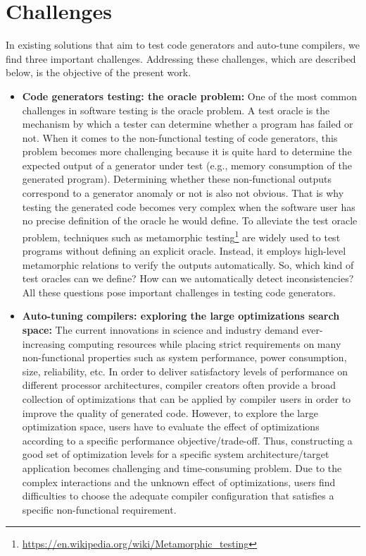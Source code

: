 \section{Challenges}
In existing solutions that aim to test code generators and auto-tune compilers, we find three important challenges. Addressing these challenges, which are described below, is the objective of the present work.
\begin{itemize}
\item
\textbf{Code generators testing: the oracle problem:} One of the most common challenges in software testing is the oracle problem. A test oracle is the mechanism by which a tester can determine whether a program has failed or not.
When it comes to the non-functional testing of code generators, this problem becomes more challenging because it is quite hard to determine the expected output of a generator under test (e.g., memory consumption of the generated program). Determining whether these non-functional outputs correspond to a generator anomaly or not is also not obvious. That is why testing the generated code becomes very complex when the software user has no precise definition of the oracle he would define. 
To alleviate the test oracle problem, techniques such as metamorphic testing\footnote{\url{https://en.wikipedia.org/wiki/Metamorphic_testing}} are widely used to test programs without defining an explicit oracle. Instead, it employs high-level metamorphic relations to verify the outputs automatically.
So, which kind of test oracles can we define? How can we automatically detect inconsistencies? All these questions pose important challenges in testing code generators.

\item
\textbf{Auto-tuning compilers: exploring the large optimizations search space:} The current innovations in science and industry demand ever-increasing computing resources while placing strict requirements on many non-functional properties such as system performance, power consumption, size, reliability, etc. In order to deliver satisfactory levels of performance on different processor architectures, compiler creators often provide a broad collection of optimizations that can be applied by compiler users in order to improve the quality of generated code. However, to explore the large optimization space, users have to evaluate the effect of optimizations according to a specific performance objective/trade-off. Thus, constructing a good set of optimization levels for a specific system architecture/target application becomes challenging and time-consuming problem. Due to the complex interactions and the unknown effect of optimizations, users find difficulties to choose the adequate compiler configuration that satisfies a specific non-functional requirement.


\end{itemize}
